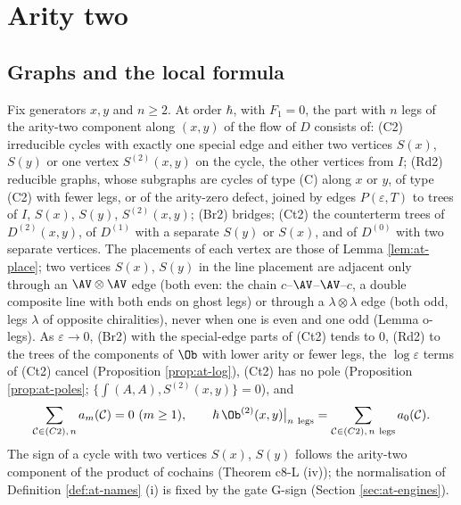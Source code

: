 
\section{Arity two}
\label{sec:at-ar2}

\subsection{Graphs and the local formula}

\begin{proposition}
\label{prop:at-classes2}
Fix generators $x,y$ and $n\ge2$. At order $\hbar$, with $F_1=0$, the part with $n$ legs of the arity-two component along $(x,y)$ of the flow of $D$ consists of: (C2) irreducible cycles with exactly one special edge and either two vertices $S(x)$, $S(y)$ or one vertex $S^{(2)}(x,y)$ on the cycle, the other vertices from $I$; (Rd2) reducible graphs, whose subgraphs are cycles of type (C) along $x$ or $y$, of type (C2) with fewer legs, or of the arity-zero defect, joined by edges $P(\varepsilon,T)$ to trees of $I$, $S(x)$, $S(y)$, $S^{(2)}(x,y)$; (Br2) bridges; (Ct2) the counterterm trees of $D^{(2)}(x,y)$, of $D^{(1)}$ with a separate $S(y)$ or $S(x)$, and of $D^{(0)}$ with two separate vertices. The placements of each vertex are those of Lemma \ref{lem:at-place}; two vertices $S(x)$, $S(y)$ in the line placement are adjacent only through an $\AV\otimes\AV$ edge (both even: the chain $c$--$\AV$--$\AV$--$c$, a double composite line with both ends on ghost legs) or through a $\lambda\otimes\lambda$ edge (both odd, legs $\lambda$ of opposite chiralities), never when one is even and one odd (Lemma o-legs). As $\varepsilon\to0$, (Br2) with the special-edge parts of (Ct2) tends to $0$, (Rd2) to the trees of the components of $\Ob$ with lower arity or fewer legs, the $\log\varepsilon$ terms of (Ct2) cancel (Proposition \ref{prop:at-log}), (Ct2) has no pole (Proposition \ref{prop:at-poles}; $\{\int(A,A),S^{(2)}(x,y)\}=0$), and
\begin{equation}
\sum_{\mathcal C\in(C2),\,n}a_m(\mathcal C)=0\ (m\ge1),\qquad \hbar\,\Ob^{(2)}(x,y)\big|_{n\ \text{legs}}=\sum_{\mathcal C\in(C2),\,n\ \text{legs}}a_0(\mathcal C).
\label{eq:at-local2}
\end{equation}
The sign of a cycle with two vertices $S(x)$, $S(y)$ follows the arity-two component of the product of cochains (Theorem c8-L (iv)); the normalisation of Definition \ref{def:at-names} (i) is fixed by the gate G-sign (Section \ref{sec:at-engines}).
\end{proposition}

